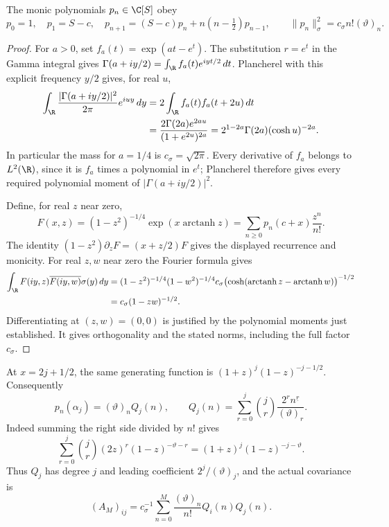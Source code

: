 \begin{lemma}
The monic polynomials $p_n\in\C[S]$ obey
\[
 p_0=1,\quad p_1=S-c,\quad
 p_{n+1}=(S-c)p_n+n(n-\tfrac12)p_{n-1},\qquad
 \|p_n\|_\sigma^2=c_\sigma n!(\vartheta)_n.
\]
\end{lemma}
\begin{proof}
For $a>0$, set $f_a(t)=\exp(at-e^t)$. The substitution $r=e^t$ in
the Gamma integral gives
$\Gamma(a+iy/2)=\int_{\R}f_a(t)e^{iyt/2}\,dt$.
Plancherel with this explicit frequency $y/2$ gives, for real $u$,
\begin{align*}
 \int_{\R}\frac{|\Gamma(a+iy/2)|^2}{2\pi}e^{iuy}\,dy
 &=2\int_{\R}f_a(t)f_a(t+2u)\,dt\\
 &=\frac{2\Gamma(2a)e^{2au}}{(1+e^{2u})^{2a}}
 =2^{1-2a}\Gamma(2a)(\cosh u)^{-2a}.
\end{align*}
In particular the mass for $a=1/4$ is $c_\sigma=\sqrt{2\pi}$.
Every derivative of $f_a$ belongs to $L^2(\R)$, since it is $f_a$
times a polynomial in $e^t$; Plancherel therefore gives every required
polynomial moment of $|\Gamma(a+iy/2)|^2$.

Define, for real $z$ near zero,
\[
 F(x,z)=(1-z^2)^{-1/4}\exp(x\operatorname{arctanh}z)
 =\sum_{n\ge0}p_n(c+x)\frac{z^n}{n!}.
\]
The identity $(1-z^2)\partial_zF=(x+z/2)F$ gives the displayed recurrence
and monicity. For real $z,w$ near zero the Fourier formula gives
\begin{align*}
 \int_{\R}F(iy,z)\overline{F(iy,w)}\sigma(y)\,dy
 &=(1-z^2)^{-1/4}(1-w^2)^{-1/4}c_\sigma
   \bigl(\cosh(\operatorname{arctanh}z-
                       \operatorname{arctanh}w)\bigr)^{-1/2}\\
 &=c_\sigma(1-zw)^{-1/2}.
\end{align*}
Differentiating at $(z,w)=(0,0)$ is justified by the polynomial moments
just established. It gives orthogonality and the stated norms, including
the full factor $c_\sigma$.
\end{proof}

At $x=2j+1/2$, the same generating function is
$(1+z)^j(1-z)^{-j-1/2}$. Consequently
\begin{equation}\label{free:eq:eval}
 p_n(\alpha_j)=(\vartheta)_n Q_j(n),\qquad
 Q_j(n)=\sum_{r=0}^j\binom jr\frac{2^r n^{\underline r}}{(\vartheta)_r}.
\end{equation}
Indeed summing the right side divided by $n!$ gives
\[
 \sum_{r=0}^j\binom jr(2z)^r(1-z)^{-\vartheta-r}
 =(1+z)^j(1-z)^{-j-\vartheta}.
\]
Thus $Q_j$ has degree $j$ and leading coefficient $2^j/(\vartheta)_j$,
and the actual covariance is
\begin{equation}\label{free:eq:cov}
 (A_M)_{ij}=c_\sigma^{-1}\sum_{n=0}^M
          \frac{(\vartheta)_n}{n!}Q_i(n)Q_j(n).
\end{equation}

